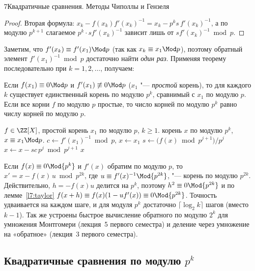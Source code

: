 \begin{lecture}{7}{Квадратичные сравнения. Методы Чиполлы и Гензеля}
\begin{proof}
Вторая формула: $x_k - f(x_k) f'(x_k)^{-1} = x_k - p^k s\, f'(x_k)^{-1}$, а по модулю
$p^{k+1}$ слагаемое $p^k \cdot s f'(x_k)^{-1}$ зависит лишь от $s f'(x_k)^{-1} \bmod p$.
\end{proof}

Заметим, что $f'(x_k) \equiv f'(x_1) \Mod p$ (так как $x_k \equiv x_1 \Mod p$), поэтому обратный
элемент $f'(x_1)^{-1} \bmod p$ достаточно найти \emph{один раз}. Применяя теорему
последовательно при $k = 1, 2, \dots$, получаем:

\begin{corollary}\label{l7:hensel-count}
Если $f(x_1) \equiv 0 \Mod p$ и $f'(x_1) \not\equiv 0 \Mod p$ ($x_1$ "--- \emph{простой}
корень), то для каждого $k$ существует единственный корень по модулю $p^k$, сравнимый с $x_1$ по
модулю $p$. Если все корни $f$ по модулю $p$ простые, то число корней по модулю $p^k$ равно
числу корней по модулю $p$.
\end{corollary}

\begin{algorithm}
\begin{algorithmic}[1]
\Require $f \in \ZZ[X]$, простой корень $x_1$ по модулю $p$, $k \ge 1$.
\Ensure корень $x$ по модулю $p^k$, $x \equiv x_1 \Mod p$.
\State $c \gets f'(x_1)^{-1} \bmod p$, $x \gets x_1$
  \State $s \gets \bigl(f(x) \bmod p^{j+1}\bigr) / p^j$ 
  \State $x \gets x - s c\, p^j \bmod p^{j+1}$
\EndFor
\State \Return $x$
\end{algorithmic}
\end{algorithm}

\begin{remark}\label{l7:newton}
Если $f(x) \equiv 0 \Mod{p^k}$ и $f'(x)$ обратим по модулю $p$, то
$x' = x - f(x)\, u \bmod p^{2k}$, где $u \equiv f'(x)^{-1} \Mod{p^{2k}}$, "--- корень по модулю
$p^{2k}$. Действительно, $h = -f(x)u$ делится на $p^k$, поэтому $h^2 \equiv 0 \Mod{p^{2k}}$ и по
лемме~\ref{l7:taylor} $f(x + h) \equiv f(x)(1 - u f'(x)) \equiv 0 \Mod{p^{2k}}$. Точность удваивается
на каждом шаге, и для модуля $p^k$ достаточно $\lceil \log_2 k \rceil$ шагов (вместо $k - 1$).
Так же устроены быстрое вычисление обратного по модулю $2^k$ для умножения Монтгомери
(лекция~5 первого семестра) и деление через умножение на «обратное» (лекция~3 первого
семестра).
\end{remark}

\subsection{\texorpdfstring{Квадратичные сравнения по модулю $p^k$}{Квадратичные сравнения по модулю p\textasciicircum k}}


\end{lecture}
